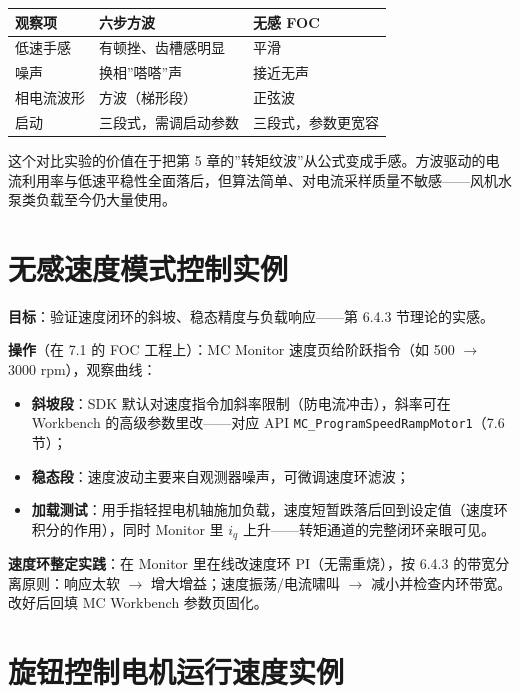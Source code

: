 \documentclass[
  UTF8,
  scheme=plain,
  fontsize=10pt,
  openany
]{ctexbook}
\begin{document}
{\def\LTcaptype{none} %
\begin{longtable}[]{@{}lll@{}}
\toprule\noalign{}
观察项 & 六步方波 & 无感 FOC \\
\midrule\noalign{}
\endhead
\bottomrule\noalign{}
\endlastfoot
低速手感 & 有顿挫、齿槽感明显 & 平滑 \\
噪声 & 换相''嗒嗒''声 & 接近无声 \\
相电流波形 & 方波（梯形段） & 正弦波 \\
启动 & 三段式，需调启动参数 & 三段式，参数更宽容 \\
\end{longtable}
}

这个对比实验的价值在于把第 5
章的''转矩纹波''从公式变成手感。方波驱动的电流利用率与低速平稳性全面落后，但算法简单、对电流采样质量不敏感------风机水泵类负载至今仍大量使用。

\section{无感速度模式控制实例}\label{ux65e0ux611fux901fux5ea6ux6a21ux5f0fux63a7ux5236ux5b9eux4f8b}

\textbf{目标}：验证速度闭环的斜坡、稳态精度与负载响应------第 6.4.3
节理论的实感。

\textbf{操作}（在 7.1 的 FOC 工程上）：MC Monitor 速度页给阶跃指令（如
500 \(\rightarrow\) 3000 rpm），观察曲线：

\begin{itemize}
\tightlist
\item
  \textbf{斜坡段}：SDK 默认对速度指令加斜率限制（防电流冲击），斜率可在
  Workbench 的高级参数里改------对应 API
  \texttt{MC\_ProgramSpeedRampMotor1}（7.6 节）；
\item
  \textbf{稳态段}：速度波动主要来自观测器噪声，可微调速度环滤波；
\item
  \textbf{加载测试}：用手指轻捏电机轴施加负载，速度短暂跌落后回到设定值（速度环积分的作用），同时
  Monitor 里 \(i_q\) 上升------转矩通道的完整闭环亲眼可见。
\end{itemize}

\textbf{速度环整定实践}：在 Monitor 里在线改速度环 PI（无需重烧），按
6.4.3 的带宽分离原则：响应太软 \(\rightarrow\)
增大增益；速度振荡/电流啸叫 \(\rightarrow\)
减小并检查内环带宽。改好后回填 MC Workbench 参数页固化。

\section{旋钮控制电机运行速度实例}\label{ux65cbux94aeux63a7ux5236ux7535ux673aux8fd0ux884cux901fux5ea6ux5b9eux4f8b}
\end{document}
